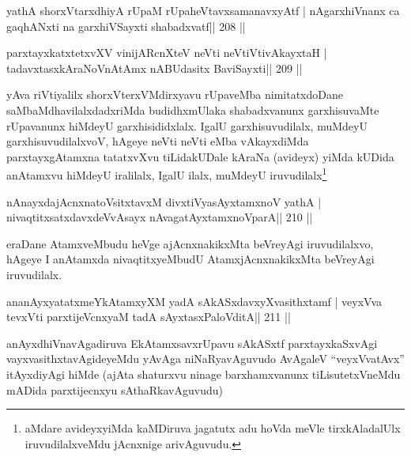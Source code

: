 
\begin{shl}
yathA shorxVtarxdhiyA rUpaM rUpaheVtavxsamanavxyAtf |
nAgarxhiVnanx ca gaqhANxti na garxhiVSayxti shabadxvatf\hfill || 208 ||
\end{shl}

\begin{shl}
parxtayxkatxtetxvXV vinijARcnXteV neVti neVtiVtivAkayxtaH |
tadavxtasxkAraNoV\s nAtAmx nABUdasitx BaviSayxti\hfill || 209 ||
\end{shl}

\begin{artha}
yAva riVtiyalilx shorxVterxVMdirxyavu rUpaveMba nimitatxdoDane
saMbaMdhavilalxdadxriMda budidhxmUlaka shabadxvanunx garxhisuvaMte
rUpavanunx hiMdeyU garxhisididxlalx. IgalU garxhisuvudilalx, muMdeyU
garxhisuvudilalxvoV, hAgeye neVti neVti eMba vAkayxdiMda
parxtayxgAtamxna tatatxvXvu tiLidakUDale kAraNa (avideyx) yiMda kUDida
anAtamxvu hiMdeyU iralilalx, IgalU ilalx, muMdeyU
iruvudilalx\footnote{aMdare avideyxyiMda kaMDiruva jagatutx adu
  hoVda meVle tirxkAladalUlx iruvudilalxveMdu jAcnxnige arivAguvudu.}
\end{artha}  
  

\begin{shl}
nAnayxdajAcnxnatoV\s sitxtavxM divxtiVyasAyx\s\s tamxnoV yathA |
nivaqtitxsatxdavxdeVvAsayx nAvagatAyxtamxnoV\s parA\hfill || 210 ||
\end{shl}

\begin{artha}
eraDane AtamxveMbudu heVge ajAcnxnakikxMta beVreyAgi iruvudilalxvo, hAgeye I anAtamxda nivaqtitxyeMbudU AtamxjAcnxnakikxMta beVreyAgi iruvudilalx.
\end{artha}


\begin{shl}
ananAyxyatatxmeYkAtamxyXM yadA sAkASxdavxyXvasithxtamf |
veyxVva tevxVti parxtijeVcnxyaM tadA sAyxtasxPaloVditA\hfill || 211 ||
\end{shl}

\begin{artha}
anAyxdhiVnavAgadiruva EkAtamxsavxrUpavu sAkASxtf parxtayxkaSxvAgi
vayxvasithxtavAgideyeMdu yAvAga niNaRyavAguvudo AvAgaleV
``veyxVvatAvx'' itAyxdiyAgi hiMde (ajAta shaturxvu ninage
barxhamxvanunx tiLisutetxVneMdu mADida parxtijecnxyu sAthaRkavAguvudu)
\end{artha}

